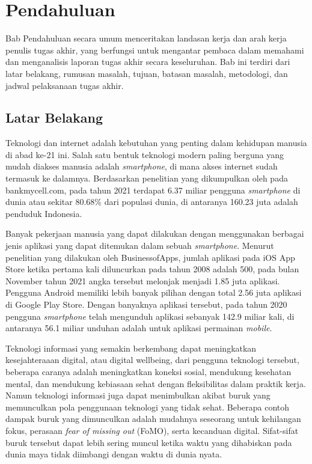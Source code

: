 \chapter{Pendahuluan}

Bab Pendahuluan secara umum menceritakan landasan kerja dan arah kerja penulis tugas akhir, yang berfungsi untuk mengantar pembaca dalam memahami dan menganalisis laporan tugas akhir secara keseluruhan. Bab ini terdiri dari latar belakang, rumusan masalah, tujuan, batasan masalah, metodologi, dan jadwal pelaksanaan tugas akhir.

\section{Latar Belakang}
\label{sec:latarbelakang}

Teknologi dan internet adalah kebutuhan yang penting dalam kehidupan manusia di abad ke-21 ini. Salah satu bentuk teknologi modern paling berguna yang mudah diakses manusia adalah \emph{smartphone}, di mana akses internet sudah termasuk ke dalamnya. Berdasarkan penelitian yang dikumpulkan oleh \textcite{turner2022howmanysmartphones} pada bankmycell.com, pada tahun 2021 terdapat 6.37 miliar pengguna \emph{smartphone} di dunia atau sekitar 80.68\% dari populasi dunia, di antaranya 160.23 juta adalah penduduk Indonesia.

Banyak pekerjaan manusia yang dapat dilakukan dengan menggunakan berbagai jenis aplikasi yang dapat ditemukan dalam sebuah \emph{smartphone}. Menurut penelitian yang dilakukan oleh BusinessofApps, jumlah aplikasi pada iOS App Store ketika pertama kali diluncurkan pada tahun 2008 adalah 500, pada bulan November tahun 2021 angka tersebut melonjak menjadi 1.85 juta aplikasi. Pengguna Android memiliki lebih banyak pilihan dengan total 2.56 juta aplikasi di Google Play Store. Dengan banyaknya aplikasi tersebut, pada tahun 2020 pengguna \emph{smartphone} telah mengunduh aplikasi sebanyak 142.9 miliar kali, di antaranya 56.1 miliar unduhan adalah untuk aplikasi permainan \emph{mobile}.

Teknologi informasi yang semakin berkembang dapat meningkatkan kesejahteraaan digital, atau digital wellbeing, dari pengguna teknologi tersebut, beberapa caranya adalah meningkatkan koneksi sosial, mendukung kesehatan mental, dan mendukung kebiasaan sehat dengan fleksibilitas dalam praktik kerja. Namun teknologi informasi juga dapat menimbulkan akibat buruk yang memunculkan pola penggunaan teknologi yang tidak sehat. Beberapa contoh dampak buruk yang dimunculkan adalah mudahnya seseorang untuk kehilangan fokus, perasaan \emph{fear of missing out} (FoMO), serta kecanduan digital. Sifat-sifat buruk tersebut dapat lebih sering muncul ketika waktu yang dihabiskan pada dunia maya tidak diimbangi dengan waktu di dunia nyata. \parencite{ALMOURAD2021101778}

